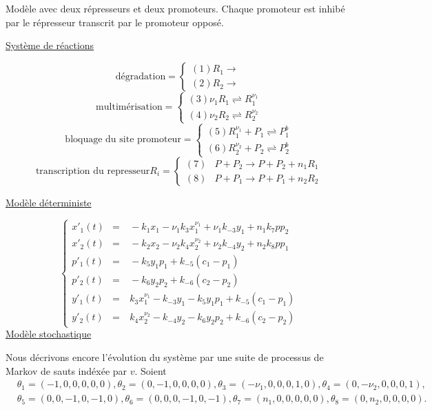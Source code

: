 \documentclass{article}
\begin{document}
Mod{\`e}le avec deux r{\'e}presseurs et deux promoteurs. Chaque promoteur
est inhib{\'e} par le r{\'e}presseur transcrit par le promoteur oppos{\'e}.


\underline{Syst{\`e}me de r{\'e}actions}

\[\textrm{d{\'e}gradation} = \left\{
\begin{array}{ll}
(1) R_1  \to  \\
(2) R_2  \to
\end{array} \right.
\]
\[
\textrm{multim{\'e}risation} = \left\{
\begin{array}{ll}
(3) \nu_1R_1  \rightleftharpoons R_1^{\nu_1} \\
(4) \nu_2R_2  \rightleftharpoons R_2^{\nu_2}
\end{array} \right.
\]
\[
\textrm{bloquage du site promoteur} = \left\{
\begin{array}{ll}
(5) R_1^{\nu_1} +P_1  \rightleftharpoons P_1^b \\
(6) R_2^{\nu_2} +P_2  \rightleftharpoons P_2^b
\end{array} \right.
\]
\[
\textrm{transcription du represseur} R_i =
\left\{
\begin{array}{ll}
(7) & P+P_2  \to P+P_2+n_1R_1 \\
(8) & P+P_1  \to P+P_1+n_2R_2
\end{array} \right.
\]


 \underline{Mod{\`e}le d{\'e}terministe}

\[
  \left \{
 \begin{array}{lll}
x'_1(t) & = & \ -k_1x_1 -\nu_1k_3x_1^{\nu_1}+\nu_1 k_{-3}y_1+n_1k_7pp_2 \\
x'_2(t) & = & \  -k_2x_2 -\nu_2k_4x_2^{\nu_2}+\nu_2 k_{-4}y_2+n_2k_8pp_1 \\
p'_1(t) & = & \ -k_5y_1p_1+k_{-5}(c_1-p_1) \\
p'_2(t) & = & \ -k_6y_2p_2+k_{-6}(c_2-p_2) \\
y'_1(t) & = & \ k_3x_1^{\nu_1} -k_{-3}y_1 -k_5y_1p_1 +k_{-5}(c_1-p_1) \\
y'_2(t) & = & \ k_4x_2^{\nu_2} -k_{-4}y_2 -k_6y_2p_2 +k_{-6}(c_2-p_2)
\end{array} \right.
\]
 \underline{Mod{\`e}le stochastique}

Nous d{\'e}crivons encore l'{\'e}volution du syst{\`e}me par une suite  de processus de
Markov de sauts ind{\'e}x{\'e}e par $v$.
Soient
\[
\begin{split}
& \theta_1= (-1,0,0,0,0,0), \theta_2=(0,-1,0,0,0,0), \theta_3=(-\nu_1,0,0,0,1,0), \theta_4=(0,-\nu_2,0,0,0,1), \\
& \theta_5=(0,0,-1,0,-1,0), \theta_6=(0,0,0,-1,0,-1), \theta_7=(n_1,0,0,0,0,0), \theta_8=(0,n_2,0,0,0,0).
\end{split}
\]
\end{document}
